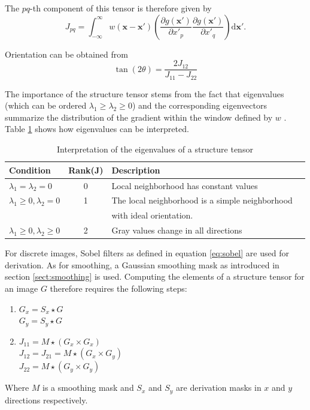 		The $pq$-th component of this tensor is therefore given by
		\begin{equation}
			J_{pq} = \int_{-\infty}^{\infty} w(\mathbf{x} - \mathbf{x'}) 
							\left(
								\dfrac{\partial g(\mathbf{x'})}{\partial x'_p} \dfrac{\partial g(\mathbf{x'})}{\partial x'_q}
							\right)
							\text{d} \mathbf{x'}.
			\label{eq:struct_tensor_pq}
		\end{equation}
		
	
		Orientation can be obtained from	
		\begin{equation}
			\tan(2\theta) = \dfrac{2 J_{12}}{J_{11} - J_{22}}
		\end{equation}
	
		The importance of the structure tensor stems from the fact that eigenvalues (which can be ordered $\lambda_1 \geq \lambda_2 \geq 0$) and the corresponding eigenvectors summarize the distribution of the gradient within the window defined by $w$ \citep{Bigun1986}. Table \ref{tab:struc_tensor_interp} shows how eigenvalues can be interpreted.
		
		\begin{table}
		
			\begin{tabular}{|l|c|l|p{5cm}| }
			\hline 
			\textbf{Condition} & \textbf{Rank(J)} & \textbf{Description }\\ 
			\hline 
			$ \lambda_1 = \lambda_2 = 0$  & 0 & Local neighborhood  has constant values\\ 
			\hline 
			$\lambda_1 \geq 0, \lambda_2 = 0 $ & 1 & The local neighborhood is a simple neighborhood \\
																				&  		& with ideal orientation.  \\ 
			\hline
			 $\lambda_1 \geq 0, \lambda_2 \geq 0 $ & 2 & Gray values change in all directions \\
			\hline
			\end{tabular} 
			
			\caption{Interpretation of the eigenvalues of a structure tensor}
			\label{tab:struc_tensor_interp}
		\end{table}
		
		
		For discrete images, Sobel filters as defined in equation \ref{eq:sobel} are used for derivation. As for smoothing, a Gaussian smoothing mask as introduced in section \ref{sect:smoothing} is used. Computing the elements of a structure tensor for an image $G$ therefore requires the following steps:
		\begin{enumerate}
			\item $G_x = S_x \star G$ \\
						$G_y = S_y \star G$
			\item $J_{11} = M \star (G_x \times G_x)$ \\
						 $J_{12} = J_{21} = M \star (G_x \times G_y)$ \\
						 $J_{22} = M \star (G_y \times G_y)$
		\end{enumerate}
		Where $M$ is a smoothing mask and $S_x$ and $S_y$ are derivation masks in $x$ and $y$ directions respectively.

